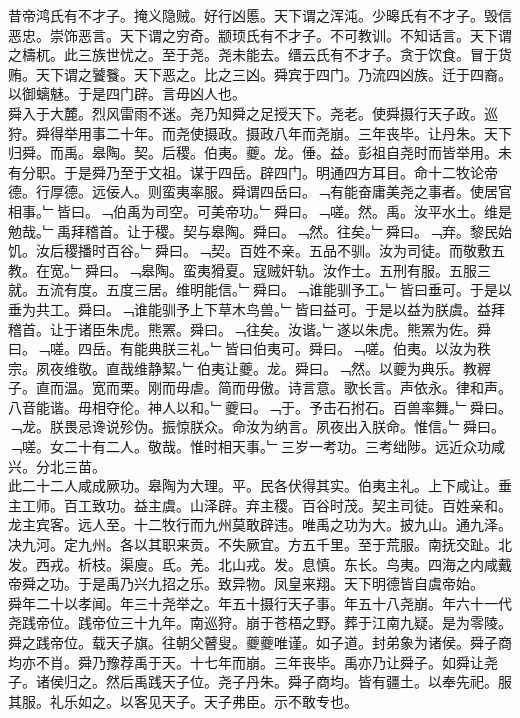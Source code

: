 \documentclass{zhvt-classic}
\begin{document}
\hspace*{2em}昔帝鸿氏有不才子。掩义隐贼。好行凶慝。天下谓之浑沌。少暤氏有不才子。毁信恶忠。崇饰恶言。天下谓之穷奇。颛顼氏有不才子。不可教训。不知话言。天下谓之檮杌。此三族世忧之。至于尧。尧未能去。缙云氏有不才子。贪于饮食。冒于货贿。天下谓之饕餮。天下恶之。比之三凶。舜宾于四门。乃流四凶族。迁于四裔。以御螭魅。于是四门辟。言毋凶人也。\\
\hspace*{2em}舜入于大麓。烈风雷雨不迷。尧乃知舜之足授天下。尧老。使舜摄行天子政。巡狩。舜得举用事二十年。而尧使摄政。摄政八年而尧崩。三年丧毕。让丹朱。天下归舜。而禹。皋陶。契。后稷。伯夷。夔。龙。倕。益。彭祖自尧时而皆举用。未有分职。于是舜乃至于文祖。谋于四岳。辟四门。明通四方耳目。命十二牧论帝德。行厚德。远佞人。则蛮夷率服。舜谓四岳曰。﹁有能奋庸美尧之事者。使居官相事。﹂皆曰。﹁伯禹为司空。可美帝功。﹂舜曰。﹁嗟。然。禹。汝平水土。维是勉哉。﹂禹拜稽首。让于稷。契与皋陶。舜曰。﹁然。往矣。﹂舜曰。﹁弃。黎民始饥。汝后稷播时百谷。﹂舜曰。﹁契。百姓不亲。五品不驯。汝为司徒。而敬敷五教。在宽。﹂舜曰。﹁皋陶。蛮夷猾夏。寇贼奸轨。汝作士。五刑有服。五服三就。五流有度。五度三居。维明能信。﹂舜曰。﹁谁能驯予工。﹂皆曰垂可。于是以垂为共工。舜曰。﹁谁能驯予上下草木鸟兽。﹂皆曰益可。于是以益为朕虞。益拜稽首。让于诸臣朱虎。熊罴。舜曰。﹁往矣。汝谐。﹂遂以朱虎。熊罴为佐。舜曰。﹁嗟。四岳。有能典朕三礼。﹂皆曰伯夷可。舜曰。﹁嗟。伯夷。以汝为秩宗。夙夜维敬。直哉维静絜。﹂伯夷让夔。龙。舜曰。﹁然。以夔为典乐。教稺子。直而温。宽而栗。刚而毋虐。简而毋傲。诗言意。歌长言。声依永。律和声。八音能谐。毋相夺伦。神人以和。﹂夔曰。﹁于。予击石拊石。百兽率舞。﹂舜曰。﹁龙。朕畏忌谗说殄伪。振惊朕众。命汝为纳言。夙夜出入朕命。惟信。﹂舜曰。﹁嗟。女二十有二人。敬哉。惟时相天事。﹂三岁一考功。三考绌陟。远近众功咸兴。分北三苗。\\
\hspace*{2em}此二十二人咸成厥功。皋陶为大理。平。民各伏得其实。伯夷主礼。上下咸让。垂主工师。百工致功。益主虞。山泽辟。弃主稷。百谷时茂。契主司徒。百姓亲和。龙主宾客。远人至。十二牧行而九州莫敢辟违。唯禹之功为大。披九山。通九泽。决九河。定九州。各以其职来贡。不失厥宜。方五千里。至于荒服。南抚交趾。北发。西戎。析枝。渠廋。氐。羌。北山戎。发。息慎。东长。鸟夷。四海之内咸戴帝舜之功。于是禹乃兴九招之乐。致异物。凤皇来翔。天下明德皆自虞帝始。\\
\hspace*{2em}舜年二十以孝闻。年三十尧举之。年五十摄行天子事。年五十八尧崩。年六十一代尧践帝位。践帝位三十九年。南巡狩。崩于苍梧之野。葬于江南九疑。是为零陵。舜之践帝位。载天子旗。往朝父瞽叟。夔夔唯谨。如子道。封弟象为诸侯。舜子商均亦不肖。舜乃豫荐禹于天。十七年而崩。三年丧毕。禹亦乃让舜子。如舜让尧子。诸侯归之。然后禹践天子位。尧子丹朱。舜子商均。皆有疆土。以奉先祀。服其服。礼乐如之。以客见天子。天子弗臣。示不敢专也。\\
\end{document}
